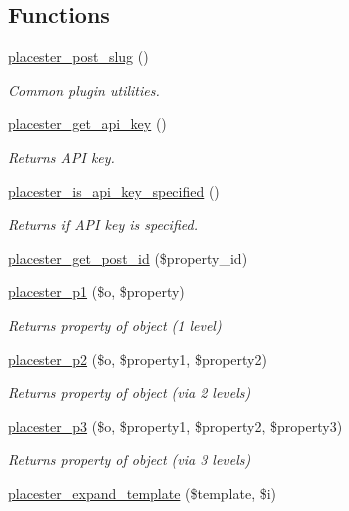 \subsection*{Functions}
\begin{DoxyCompactItemize}
\item 
\hyperlink{util_8php_ad156b1e9cf7ab8127e2d85a2fb7df9a1}{placester\_\-post\_\-slug} ()
\begin{DoxyCompactList}\small\item\em Common plugin utilities. \end{DoxyCompactList}\item 
\hyperlink{util_8php_a636c34250598390e80800f466754f857}{placester\_\-get\_\-api\_\-key} ()
\begin{DoxyCompactList}\small\item\em Returns API key. \end{DoxyCompactList}\item 
\hyperlink{util_8php_a81a584a79609706f639f6e12be08a254}{placester\_\-is\_\-api\_\-key\_\-specified} ()
\begin{DoxyCompactList}\small\item\em Returns if API key is specified. \end{DoxyCompactList}\item 
\hyperlink{util_8php_a3f565ee823b25cde4f4b8c31bdeaae19}{placester\_\-get\_\-post\_\-id} (\$property\_\-id)
\item 
\hyperlink{util_8php_a081eb5480b0a4c5439874580caeaa00a}{placester\_\-p1} (\$o, \$property)
\begin{DoxyCompactList}\small\item\em Returns property of object (1 level) \end{DoxyCompactList}\item 
\hyperlink{util_8php_a9c5fe72d0440278b3bd4142052678fea}{placester\_\-p2} (\$o, \$property1, \$property2)
\begin{DoxyCompactList}\small\item\em Returns property of object (via 2 levels) \end{DoxyCompactList}\item 
\hyperlink{util_8php_a64294dceff608ec39b1e9749a49fd9f6}{placester\_\-p3} (\$o, \$property1, \$property2, \$property3)
\begin{DoxyCompactList}\small\item\em Returns property of object (via 3 levels) \end{DoxyCompactList}\item 
\hyperlink{util_8php_a7db2d32f08e92a3a4aa6f519c669c0e2}{placester\_\-expand\_\-template} (\$template, \$i)

\end{DoxyCompactItemize}
